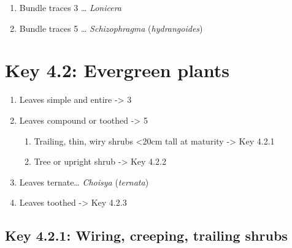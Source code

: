 \documentclass[openany]{book}
\providecommand{\tightlist}{%
  \setlength{\itemsep}{0pt}\setlength{\parskip}{0pt}}
\begin{document}
\begin{enumerate}
  \begin{enumerate}
  \def\labelenumii{\arabic{enumii}.}
  \setcounter{enumii}{14}
  \tightlist
  \item
    Bundle traces 3 \ldots{} \emph{Lonicera}
  \item
    Bundle traces 5 \ldots{} \emph{Schizophragma} (\emph{hydrangoides})
  \end{enumerate}
\end{enumerate}

\hypertarget{key-4.2-evergreen-plants}{%
\section*{Key 4.2: Evergreen plants}\label{key-4.2-evergreen-plants}}

\begin{enumerate}
\def\labelenumi{\arabic{enumi}.}
\tightlist
\item
  Leaves simple and entire -\textgreater{} 3
\item
  Leaves compound or toothed -\textgreater{} 5

  \begin{enumerate}
  \def\labelenumii{\arabic{enumii}.}
  \setcounter{enumii}{2}
  \tightlist
  \item
    Trailing, thin, wiry shrubs \textless{}20cm tall at maturity -\textgreater{} Key 4.2.1
  \item
    Tree or upright shrub -\textgreater{} Key 4.2.2
  \end{enumerate}
\item
  Leaves ternate\ldots{} \emph{Choisya} (\emph{ternata})
\item
  Leaves toothed -\textgreater{} Key 4.2.3
\end{enumerate}

\hypertarget{key-4.2.1-wiring-creeping-trailing-shrubs}{%
\subsection*{Key 4.2.1: Wiring, creeping, trailing shrubs}\label{key-4.2.1-wiring-creeping-trailing-shrubs}}
\end{document}
